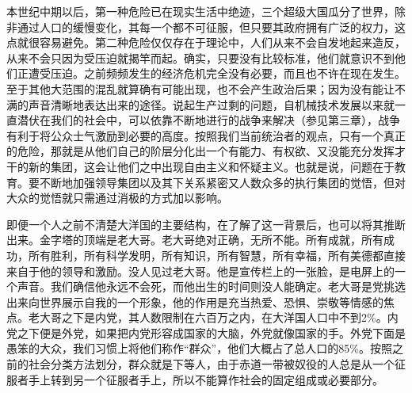 本世纪中期以后，第一种危险已在现实生活中绝迹，三个超级大国瓜分了世界，除非通过人口的缓慢变化，其每一个都不可征服，但只要其政府拥有广泛的权力，这点就很容易避免。第二种危险仅仅存在于理论中，人们从来不会自发地起来造反，从来不会只因为受压迫就揭竿而起。确实，只要没有比较标准，他们就意识不到他们正遭受压迫。之前频频发生的经济危机完全没有必要，而且也不许在现在发生。至于其他大范围的混乱就算确有可能出现，也不会产生政治后果；因为没有能让不满的声音清晰地表达出来的途径。说起生产过剩的问题，自机械技术发展以来就一直潜伏在我们的社会中，可以依靠不断地进行的战争来解决（参见第三章），战争有利于将公众士气激励到必要的高度。按照我们当前统治者的观点，只有一个真正的危险，那就是从他们自己的阶层分化出一个有能力、有权欲、又没能充分发挥才干的新的集团，这会让他们之中出现自由主义和怀疑主义。也就是说，问题在于教育。要不断地加强领导集团以及其下关系紧密又人数众多的执行集团的觉悟，但对大众的觉悟就只需通过消极的方式加以影响。

即便一个人之前不清楚大洋国的主要结构，在了解了这一背景后，也可以将其推断出来。金字塔的顶端是老大哥。老大哥绝对正确，无所不能。所有成就，所有成功，所有胜利，所有科学发明，所有知识，所有智慧，所有幸福，所有美德都直接来自于他的领导和激励。没人见过老大哥。他是宣传栏上的一张脸，是电屏上的一个声音。我们确信他永远不会死，而他出生的时间则没人能确定。老大哥是党挑选出来向世界展示自我的一个形象，他的作用是充当热爱、恐惧、崇敬等情感的焦点。老大哥之下是内党，其人数限制在六百万之内，在大洋国人口中不到2\%。内党之下便是外党，如果把内党形容成国家的大脑，外党就像国家的手。外党下面是愚笨的大众，我们习惯上将他们称作``群众''，他们大概占了总人口的85\%。按照之前的社会分类方法划分，群众就是下等人，由于赤道一带被奴役的人总是从一个征服者手上转到另一个征服者手上，所以不能算作社会的固定组成或必要部分。

